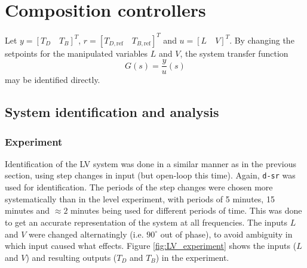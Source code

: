 \documentclass[12pt]{article}
\begin{document}
\newpage
\section{Composition controllers}
Let $y = [T_D \quad T_B]^T$, $r = [T_{D, \textrm{ref}} \quad T_{B, \textrm{ref}}]^T$ and $u = [L \quad V]^T$. By changing the setpoints for the manipulated variables $L$ and $V$, the system transfer function
\begin{equation}
G(s) = \frac{y}{u}(s)
\end{equation}
may be identified directly.
\subsection{System identification and analysis}
\subsubsection{Experiment}
Identification of the LV system was done in a similar manner as in the previous section, using step changes in input (but open-loop this time). Again, \texttt{d-sr} was used for identification. The periods of the step changes were chosen more systematically than in the level experiment, with periods of 5 minutes, 15 minutes and $\approx2$ minutes being used for different periods of time. This was done to get an accurate representation of the system at all frequencies. The inputs $L$ and $V$ were changed alternatingly (i.e. $90^\circ$ out of phase), to avoid ambiguity in which input caused what effects. Figure \ref{fig:LV_experiment} shows the inputs ($L$ and $V$) and resulting outputs ($T_D$ and $T_B$) in the experiment.
\end{document}
